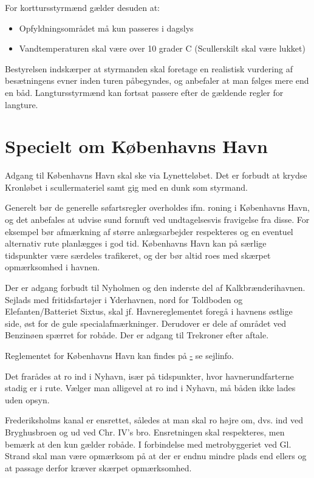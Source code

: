 \documentclass{article}
\begin{document}
For korttursstyrmænd gælder desuden at:
\begin{itemize}
    \item Opfyldningsområdet må kun passeres i dagslys
    \item Vandtemperaturen skal være over 10 grader C (Scullerskilt skal
        være lukket)
\end{itemize}

Bestyrelsen indskærper at styrmanden skal foretage en realistisk
vurdering af besætningens evner inden turen påbegyndes, og anbefaler at
man følges mere end en båd. Langtursstyrmænd kan fortsat passere efter de
gældende regler for langture.

\section{Specielt om Københavns Havn}

Adgang til Københavns Havn skal ske via Lynetteløbet.  Det er forbudt at
krydse Kronløbet i scullermateriel samt gig med en dunk som styrmand.

Generelt bør de generelle søfartsregler overholdes ifm. roning i
Københavns Havn, og det anbefales at udvise sund fornuft ved
undtagelsesvis fravigelse fra disse. For eksempel bør afmærkning af
større anlægsarbejder respekteres og en eventuel alternativ rute
planlægges i god tid. Københavns Havn kan på særlige tidspunkter være
særdeles trafikeret, og der bør altid roes med skærpet opmærksomhed i
havnen.

Der er adgang forbudt til Nyholmen og den inderste del af
Kalkbrænderihavnen. Sejlads med fritidsfartøjer i Yderhavnen, nord for
Toldboden og Elefanten/Batteriet Sixtus, skal jf. Havnereglementet foregå
i havnens østlige side, øst for de gule specialafmærkninger.  Derudover
er dele af området ved Benzinøen spærret for robåde. Der er adgang til
Trekroner efter aftale.

Reglementet for Københavns Havn kan findes på
\href{http://www.byoghavn.dk/cphport.aspx} - se sejlinfo.

Det frarådes at ro ind i Nyhavn, især på tidspunkter, hvor
havnerundfarterne stadig er i rute. Vælger man alligevel at ro ind i
Nyhavn, må båden ikke lades uden opsyn.

Frederiksholms kanal er ensrettet, således at man skal ro højre om, dvs.
ind ved Bryghusbroen og ud ved Chr.  IV's bro. Ensretningen skal
respekteres, men bemærk at den kun gælder robåde. I forbindelse med
metrobyggeriet ved Gl. Strand skal man være opmærksom på at der er endnu
mindre plads end ellers og at passage derfor kræver skærpet opmærksomhed.
\end{document}
